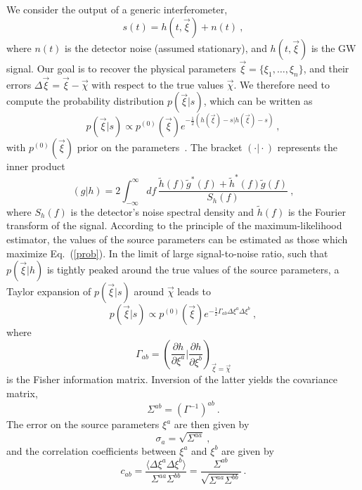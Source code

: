 \documentclass[aps,twocolumn,showpacs,preprintnumbers,nofootinbib,prd,superscriptaddress,groupedaddress,10pt]{revtex4-1}
\begin{document}
We consider the output of a generic interferometer,
\begin{equation}
s(t)=h(t,\vec{\xi})+n(t)\ ,
\end{equation}
where $n(t)$ is the detector noise (assumed stationary), and $h(t,\vec{\xi})$ is the GW signal. 
Our goal is to recover the physical parameters $\vec{\xi}=\{\xi_1,\ldots,\xi_n\}$, and their 
errors $\Delta\vec{\xi}=\vec{\xi} -\vec{\chi}$ with respect to the true values $\vec{\chi}$. 
We therefore need to compute the  
probability distribution $p(\vec{\xi}\vert s)$, which can be written as
\begin{equation}\label{prob}
p(\vec{\xi}\vert s)\propto p^{(0)}(\vec{\xi})e^{-\frac{1}{2}(h(\vec{\xi})
-s\vert h(\vec{\xi})-s)}\ ,
\end{equation}
with $p^{(0)}(\vec{\xi})$ prior on the parameters~\cite{PhysRevD.49.2658}.
The bracket $(\cdot \vert \cdot)$ represents the inner product
%
\begin{equation}\label{inner}
(g\vert h)=2\int_{-\infty}^{\infty}df\,\frac{\tilde h(f)\tilde g^{*}(f)+\tilde h^{*}(f)\tilde g(f)}{S_{h}(f)}\ ,
\end{equation}
%
where $S_h(f)$ is the detector's noise spectral density and $\tilde{h}(f)$ is the Fourier transform 
of the signal.
According to the principle of the maximum-likelihood estimator, the values of the
source parameters can be estimated as those which maximize Eq.~(\ref{prob}).  
In the limit of large signal-to-noise ratio, such that $p(\vec{\xi}\vert h)$ is tightly 
peaked around the true values of the source parameters, a Taylor expansion of 
$p(\vec{\xi}\vert s)$ around $\vec{\chi}$ leads to
%
\begin{equation}\label{prob1}
p( \vec{\xi}\vert s)\propto p^{(0)}(\vec{\xi})e^{-\frac{1}{2}\Gamma_{ab}\Delta \xi^{a}\Delta \xi^{b}}\ ,
\end{equation}
where 
\begin{equation}\label{FisherM}
\Gamma_{ab}=\left(\frac{\partial h}{\partial \xi^a}\bigg\vert \frac{\partial h}{\partial \xi^b}\right)_{\vec{\xi}=\vec{\chi}}
\end{equation}
is the Fisher information matrix. Inversion of the latter yields the 
covariance matrix,
\begin{equation}\label{covariance}
\Sigma^{ab}=\left(\Gamma^{-1}\right)^{ab}\ .
\end{equation}
The error on the source parameters $\xi^{a}$ are then given by
\begin{equation}\label{error}
\sigma_{a}=\sqrt{\Sigma^{aa}}\ ,
\end{equation}
and the correlation coefficients between $\xi^{a}$ and $\xi^{b}$ are given by
\begin{equation}\label{corr}
c_{ab}=\frac{\langle \Delta \xi^{a}\Delta \xi^{b}\rangle}{\Sigma^{aa}\Sigma^{bb}}=
\frac{\Sigma^{ab}}{\sqrt{\Sigma^{aa}\Sigma^{bb}}}\ .
\end{equation}
%
\end{document}
